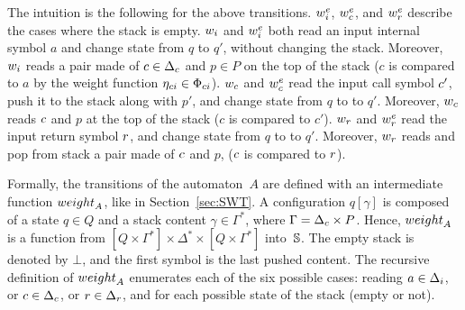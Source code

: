 \noindent
The intuition is the following for the above transitions.
$\weiei$, $\weiec$, and $\weier$ describe the cases where the stack is empty.
%
\noindent
$\weii$ and $\weiei$ both read an input internal symbol $a$ and change state from $q$ to $q'$,
without changing the stack.
Moreover, $\weii$ reads a pair made of
${\call{c}} \in \Deltac$ and $p \in P$ on the top of the stack
($c$ is compared to $a$ by the weight function $\eta_\mathsf{ci} \in \Phici$).
%
\noindent
$\weic$ and $\weiec$ read the input call symbol $c'$,
push it to the stack along with $p'$, and change state from $q$ to to $q'$.
Moreover, $\weic$ reads ${c}$ and $p$ at the top of the stack
($c$ is compared to $c'$).
%
\noindent
$\weir$ and $\weier$ read the input return symbol $r$, and change state from $q$ to to $q'$.
Moreover, $\weir$ reads and pop from stack a pair made of $c$ and $p$,
($c$ is compared to $r$).

Formally, the transitions of the automaton~$A$ are defined
with an intermediate function $\weight_A$, like in Section~\ref{sec:SWT}.
%
A configuration $q[\gamma]$
is composed of a state $q \in Q$
and a stack content $\gamma \in \Gamma^*$,
where $\Gamma = \Deltac \times P$.
Hence, $\weight_A$ is a function from
$[Q \times \Gamma^*] \times \Delta^* \times [Q \times \Gamma^*]$ into~$\mathbb{S}$.
The empty stack is denoted by $\bot$, and the first %
symbol is the last pushed content.
%
The recursive definition of $\weight_A$
enumerates each of the six possible cases:
reading $a \in \Deltai$,
or $\call{c} \in \Deltac$, or $\return{r} \in \Deltar$,
and for each possible state of the stack (empty or not).

